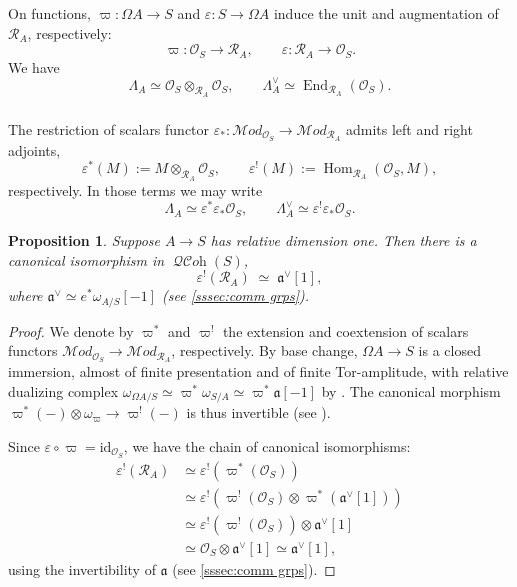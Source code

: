 \documentclass[12pt, oneside]{amsart}
\numberwithin{equation}{section}
\newtheorem{proposition}[subsubsection]{Proposition}
\theoremstyle{remark}
\theoremstyle{plain}
\newcommand{\MOD}{\mathcal{M}\textit{od}}
\DeclareMathOperator{\QCOH}{\mathcal{QC}\textit{oh}}
\DeclareMathOperator{\Hom}{Hom}
\newcommand{\R}{\mathcal{R}}
\newcommand{\RA}{\R_A}
\newcommand{\fra}{\mathfrak{a}}
\newcommand{\frav}{\mathfrak{a}^\vee}
\newcommand{\lam}{\Lambda}
\newcommand{\lamco}{\Lambda^\vee}
\newcommand{\OO}{\mathcal{O}}
\newcommand{\id}{\mathrm{id}}
\newcommand{\eps}{\varepsilon}
\begin{document}
\subsubsection{}

On functions, $\varpi : \Omega A \to S$ and $\eps : S \to \Omega A$ induce the unit and augmentation of $\RA$, respectively:
\[
  \varpi : \OO_S \to \RA,
  \qquad
  \eps : \RA \to \OO_S.
\]
We have
\[
  \lam_A \simeq \OO_S \otimes_{\RA} \OO_S,
  \qquad
  \lamco_A \simeq \operatorname{End}_{\RA}(\OO_S).
\]

\subsubsection{}

The restriction of scalars functor $\eps_* : \MOD_{\OO_S} \to \MOD_{\RA}$ admits left and right adjoints,
\[
  \eps^*(M) := M \otimes_{\RA} \OO_S,
  \qquad \eps^!(M) := \Hom_{\RA}(\OO_S, M),
\]
respectively.
In those terms we may write
\[ \lam_A \simeq \eps^*\eps_*\OO_S, \qquad \lamco_A \simeq \eps^!\eps_*\OO_S. \]

\begin{proposition}\label{prop:eps^!(R)}
  Suppose $A \to S$ has relative dimension one.
  Then there is a canonical isomorphism in $\QCOH(S)$,
  \[
    \eps^!(\RA) \;\simeq\; \frav[1],
  \]
  where $\frav \simeq e^*\omega_{A/S}[-1]$ (see \ref{sssec:comm grps}).
\end{proposition}
\begin{proof}
  We denote by $\varpi^*$ and $\varpi^!$ the extension and coextension of scalars functors $\MOD_{\OO_S} \to \MOD_{\RA}$, respectively.
  By base change, $\Omega A \to S$ is a closed immersion, almost of finite presentation and of finite Tor-amplitude, with relative dualizing complex $\omega_{\Omega A/S} \simeq \varpi^*\omega_{S/A} \simeq \varpi^*\fra[-1]$ by \cite[Prop.~6.4.2.1]{SAG}.
  The canonical morphism $\varpi^*(-) \otimes \omega_{\varpi} \to \varpi^!(-)$ is thus invertible (see \cite[Cor.~6.4.2.7]{SAG}).

  Since $\eps \circ \varpi = \id_{\OO_S}$, we have the chain of canonical isomorphisms:
  \begin{align*}
    \eps^!(\RA)
    &\simeq \eps^!(\varpi^*(\OO_S))\\
    &\simeq \eps^!(\varpi^!(\OO_S) \otimes \varpi^*(\frav[1]))\\
    &\simeq \eps^!(\varpi^!(\OO_S)) \otimes \frav[1]\\
    &\simeq \OO_S \otimes \frav[1] \simeq \frav[1],
  \end{align*}
  using the invertibility of $\fra$ (see \ref{sssec:comm grps}).
\end{proof}
\end{document}
